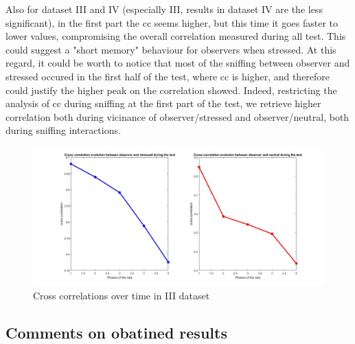 \documentclass[a4paper]{article}
\begin{document}
		
		Also for dataset III  and IV (especially III, results in dataset IV are the less significant), in the first part the cc seems higher, but this time it goes faster to lower values, compromising the overall correlation measured during all test. This could suggest a "short memory" behaviour for observers when stressed. At this regard, it could be worth to notice that most of the sniffing between observer and stressed occured in the first half of the test, where cc is higher, and therefore could justify the higher peak on the correlation showed. Indeed, restricting the analysis of cc during sniffing at the first part of the test, we retrieve higher correlation both during vicinance of observer/stressed and observer/neutral, both during sniffing interactions.
		
		
			\begin{figure}[H]
			\begin{center}
				\hspace*{-1cm}
				\includegraphics[scale=.36]{corr_time3.jpg} 
			\end{center}  
			\caption{Cross correlations over time in III dataset}
			
		\end{figure}
		
		
		
\subsection{Comments on obatined results}		
		
\end{document}
